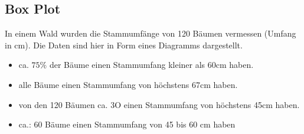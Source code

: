 \newpage
\subsection{Box Plot}

In einem Wald wurden die Stammumfänge von 120 Bäumen vermessen (Umfang in cm). Die Daten sind hier in Form eines Diagramms dargestellt.

\hfill \break
\begin{center}

\hfill \break
\begin{itemize}
    \item ca. $75\%$ der Bäume einen Stammumfang kleiner als 60cm haben.
    \item alle Bäume einen Stammumfang von höchstens 67cm haben.
    \item von den 120 Bäumen ca. 3O einen Stammumfang von höchstens 45cm haben.
    \item ca.: 60 Bäume einen Stammumfang von 45 bis 60 cm haben
\end{itemize}
\end{center}
